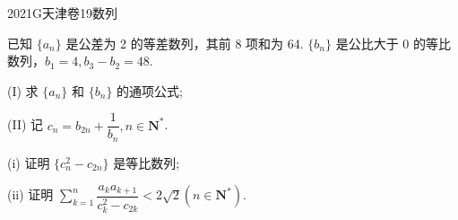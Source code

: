 
\begin{problem}{2021}{G}{天津卷}{19}{数列}

已知 $\{a_n\}$ 是公差为 2 的等差数列，其前 8 项和为 64. $\{b_n\}$ 是公比大于 0 的等比数列，$b_1=4, b_3-b_2=48$.

(I) 求 $\{a_n\}$ 和 $\{b_n\}$ 的通项公式;

(II) 记 $c_n=b_{2n}+\dfrac{1}{b_n}, n \in \mathbf{N}^*$.

(i) 证明 $\{c_n^2-c_{2n}\}$ 是等比数列;

(ii) 证明 $\sum\limits_{k=1}^n \dfrac{a_k a_{k+1}}{c_k^2-c_{2k}}<2\sqrt{2}(n \in \mathbf{N}^*)$.

\end{problem}